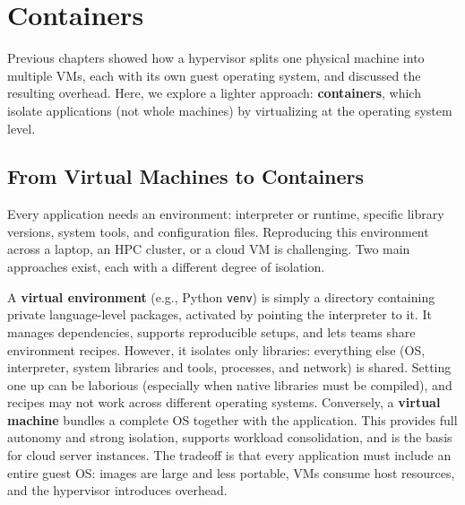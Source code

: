 \chapter{Containers} \label{ch:containers}

Previous chapters showed how a hypervisor splits one physical machine into multiple VMs, each with its own guest operating system, and discussed the resulting overhead. Here, we explore a lighter approach: \textbf{containers}, which isolate applications (not whole machines) by virtualizing at the operating system level.

\section{From Virtual Machines to Containers} \label{sec:vm_to_containers}

Every application needs an environment: interpreter or runtime, specific library versions, system tools, and configuration files. Reproducing this environment across a laptop, an HPC cluster, or a cloud VM is challenging. Two main approaches exist, each with a different degree of isolation.

A \textbf{virtual environment} (e.g., Python \texttt{venv}) is simply a directory containing private language-level packages, activated by pointing the interpreter to it. It manages dependencies, supports reproducible setups, and lets teams share environment recipes. However, it isolates only libraries: everything else (OS, interpreter, system libraries and tools, processes, and network) is shared. Setting one up can be laborious (especially when native libraries must be compiled), and recipes may not work across different operating systems. Conversely, a \textbf{virtual machine} bundles a complete OS together with the application. This provides full autonomy and strong isolation, supports workload consolidation, and is the basis for cloud server instances. The tradeoff is that every application must include an entire guest OS: images are large and less portable, VMs consume host resources, and the hypervisor introduces overhead.

